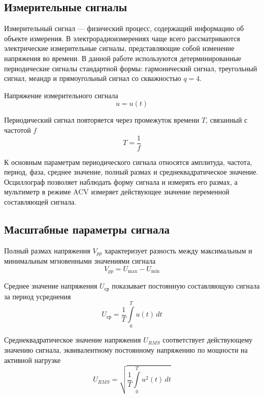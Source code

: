 \documentclass[12pt,a4paper]{article}
\begin{document}
\subsection{Измерительные сигналы}

Измерительный сигнал --- физический процесс, содержащий информацию об объекте измерения. В электрорадиоизмерениях чаще всего рассматриваются электрические измерительные сигналы, представляющие собой изменение напряжения во времени. В данной работе используются детерминированные периодические сигналы стандартной формы: гармонический сигнал, треугольный сигнал, меандр и прямоугольный сигнал со скважностью $q = 4$.

Напряжение измерительного сигнала
\begin{equation*}
u = u(t)
\end{equation*}

Периодический сигнал повторяется через промежуток времени $T$, связанный с частотой $f$
\begin{equation*}
T = \frac{1}{f}
\end{equation*}

К основным параметрам периодического сигнала относятся амплитуда, частота, период, фаза, среднее значение, полный размах и среднеквадратическое значение. Осциллограф позволяет наблюдать форму сигнала и измерять его размах, а мультиметр в режиме ACV измеряет действующее значение переменной составляющей сигнала.

\subsection{Масштабные параметры сигнала}

Полный размах напряжения $V_{pp}$ характеризует разность между максимальным и минимальным мгновенными значениями сигнала
\begin{equation*}
V_{pp}=U_{\max}-U_{\min}
\end{equation*}

Среднее значение напряжения $U_{\text{ср}}$ показывает постоянную составляющую сигнала за период усреднения
\begin{equation*}
U_{\text{ср}}=\frac{1}{T}\int\limits_0^T u(t)\,dt
\end{equation*}

Среднеквадратическое значение напряжения $U_{RMS}$ соответствует действующему значению сигнала, эквивалентному постоянному напряжению по мощности на активной нагрузке
\begin{equation*}
U_{RMS}=\sqrt{\frac{1}{T}\int\limits_0^T u^2(t)\,dt}
\end{equation*}
\end{document}

